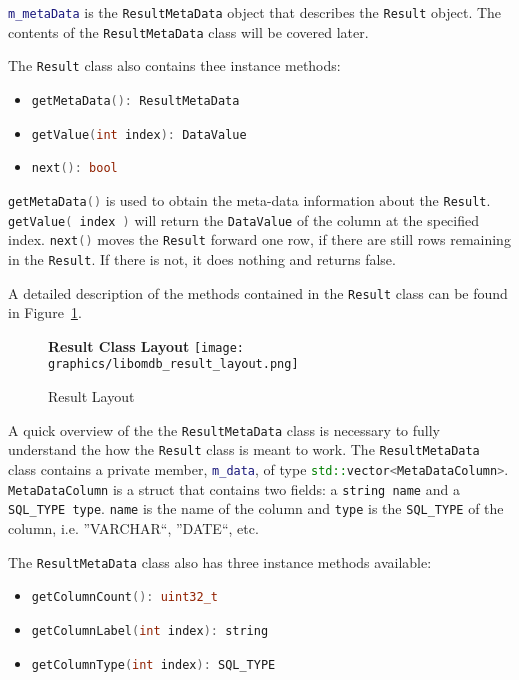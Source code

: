 \documentclass[letterpaper, 11pt]{article}
\newcommand{\inlinecode}[1]{\colorbox{codegrey}{\lstinline[language=C++]{#1}}}
\begin{document}
  \inlinecode{m_metaData} is the
  \inlinecode{ResultMetaData} object that describes the
  \inlinecode{Result} object. The contents of the
  \inlinecode{ResultMetaData} class will be covered later.
  \par\vspace{\baselineskip}
  The \inlinecode{Result} class also contains thee instance methods:
  \begin{itemize}
    \item \inlinecode{getMetaData(): ResultMetaData}
    \item \inlinecode{getValue(int index): DataValue}
    \item \inlinecode{next(): bool}
  \end{itemize}
  \inlinecode{getMetaData()} is used to obtain the meta-data
  information about the \inlinecode{Result}.
  \inlinecode{getValue( index )} will return the
  \inlinecode{DataValue} of the column at the specified index.
  \inlinecode{next()} moves the
  \inlinecode{Result} forward one row, if there are still rows
  remaining in the \inlinecode{Result}. If there is not, it does
  nothing and returns false.
  \par\vspace{\baselineskip}
  A detailed description of the methods contained in the \inlinecode{Result} class 
  can be found in Figure~\ref{fig:result_methods}.
  \begin{figure}[H]
    \centering
    \textbf{Result Class Layout}
    \texttt{[image: graphics/libomdb\_result\_layout.png]}
    \caption{Result Layout}
    \label{fig:result_methods}
  \end{figure}
  \par\vspace{\baselineskip}
  A quick overview of the the \inlinecode{ResultMetaData} class is necessary to fully understand 
  the how the \inlinecode{Result} class is meant to work. The \inlinecode{ResultMetaData} class 
  contains a private member, \inlinecode{m_data}, of type \inlinecode{std::vector<MetaDataColumn>}.
  \inlinecode{MetaDataColumn} is a struct that contains two fields:
  a \inlinecode{string name} and a \inlinecode{SQL_TYPE type}. \inlinecode{name}
  is the name of the column and \inlinecode{type} is the
  \inlinecode{SQL_TYPE} of the column, i.e. ''VARCHAR``, ''DATE``, etc.
  \par\vspace{\baselineskip}
  The \inlinecode{ResultMetaData} class also has
  three instance methods available:
  \begin{itemize}
    \item \inlinecode{getColumnCount(): uint32_t}
    \item \inlinecode{getColumnLabel(int index): string}
    \item \inlinecode{getColumnType(int index): SQL_TYPE}
  \end{itemize}
\end{document}
